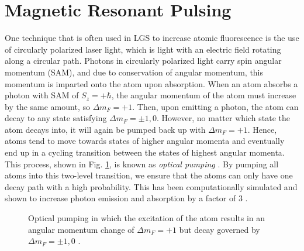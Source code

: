 \section{Magnetic Resonant Pulsing}


One technique that is often used in LGS to increase atomic fluorescence is the use of circularly polarized laser light, which is light with an electric field rotating along a circular path. Photons in circularly polarized light carry spin angular momentum (SAM), and due to conservation of angular momentum, this momentum is imparted onto the atom upon absorption. When an atom absorbs a photon with SAM of $S_z = + \hbar$, the angular momentum of the atom must increase by the same amount, so $\Delta m_F = + 1$. Then, upon emitting a photon, the atom can decay to any state satisfying $\Delta m_F = \pm 1, 0$. However, no matter which state the atom decays into, it will again be pumped back up with $\Delta m_F = +1$. Hence, atoms tend to move towards states of higher angular momenta and eventually end up in a cycling transition between the states of highest angular momenta. This process, shown in Fig. \ref{fig:opticalpumping}, is known as \textit{optical pumping} \cite{Kane2014}. By pumping all atoms into this two-level transition, we ensure that the atoms can only have one decay path with a high probability. This has been computationally simulated and shown to increase photon emission and absorption by a factor of 3 \cite{Kibblewhite2009}.



\begin{figure}[ht]
	\centering
	
	\caption{Optical pumping in which the excitation of the atom results in an angular momentum change of $\Delta m_F = +1$ but decay governed by $\Delta m_F = \pm 1, 0$ \protect\cite{opticalpumping}.}
	\label{fig:opticalpumping}
\end{figure}



